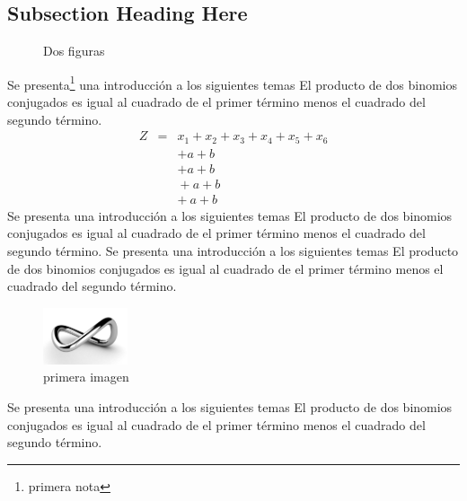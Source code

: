 \documentclass[journal]{IEEEtran}
\begin{document}
\subsection{Subsection Heading Here}
\begin{figure}[!t]
\centering
{}
\hfil
{}
\caption{Dos figuras}
\label{fig_sim}
\end{figure}
Se presenta\footnote{primera nota} una introducción a los siguientes temas El producto de dos binomios conjugados es igual al cuadrado de el primer término menos el cuadrado del segundo término.
\setlength{\arraycolsep}{0.0em}
\begin{eqnarray}
Z&{}={}&x_1 + x_2 + x_3 + x_4 + x_5 + x_6\nonumber\\
&&+a + b\\
&&+{}a + b\\
&&{}+a + b\\
&&{+}\:a + b
\end{eqnarray}
\setlength{\arraycolsep}{5pt}
Se presenta una introducción a los siguientes temas El producto de dos binomios conjugados es igual al cuadrado de el primer término menos el cuadrado del segundo término.
Se presenta una introducción a los siguientes temas El producto de dos binomios conjugados es igual al cuadrado de el primer término menos el cuadrado del segundo término.
\begin{figure}[!t]
\centering
\includegraphics[width=2.5cm]{figuras/infinito}
\caption{primera imagen}
\label{fig_sim}
\end{figure}
Se presenta una introducción a los siguientes temas El producto de dos binomios conjugados es igual al cuadrado de el primer término menos el cuadrado del segundo término.
\end{document}
